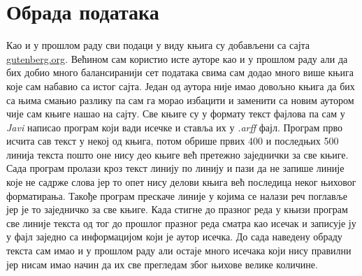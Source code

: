 \documentclass[11pt]{article}
\begin{document}
\section{Обрада података}
Као и у прошлом раду сви подаци у виду књига су добављени са сајта \href{https://www.gutenberg.org}{gutenberg.org}. Већином сам користио исте ауторе као и у прошлом раду али да бих добио много балансиранији сет података свима сам додао много више књига које сам набавио са истог сајта. Један од аутора није имао довољно књига да бих са њима смањио разлику па сам га морао избацити и заменити са новим аутором чије сам књиге нашао на сајту. Све књиге су у формату текст фајлова па сам у \emph{Javi} написао програм који вади исечке и ставља их у \emph{.arff} фајл. Програм прво исчита сав текст у некој од књига, потом обрише првих 400 и последњих 500 линија текста пошто оне нису део књиге већ претежно заједнички за све књиге. Сада програм пролази кроз текст линију по линију и пази да не запише линије које не садрже слова јер то опет нису делови књига већ последица неког њиховог форматирања.  Такође програм прескаче линије у којима се налази реч поглавље јер је то заједничко за све књиге. Када стигне до празног реда у књизи програм све линије текста од тог до прошлог празног реда сматра као исечак и записује ју у фајл заједно са информацијом који је аутор исечка. До сада наведену обраду текста сам имао и у прошлом раду али остаје много исечака који нису правилни јер нисам имао начин да их све прегледам због њихове велике количине.
\end{document}
